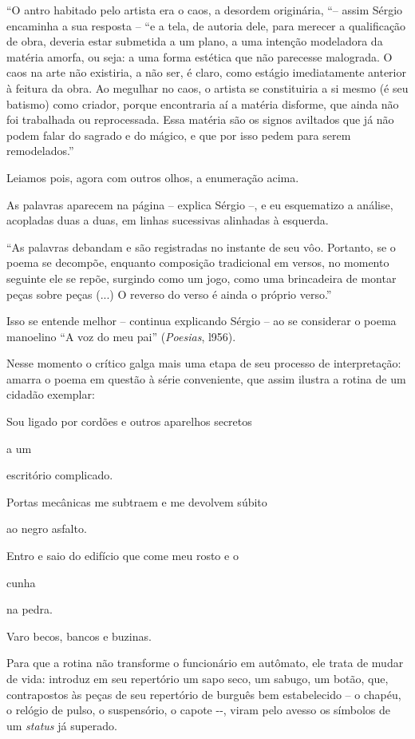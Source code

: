 ``O antro habitado pelo artista era o caos, a desordem originária, ``--
assim Sérgio encaminha a sua resposta -- ``e a tela, de autoria dele,
para merecer a qualificação de obra, deveria estar submetida a um plano,
a uma intenção modeladora da matéria amorfa, ou seja: a uma forma
estética que não parecesse malograda. O caos na arte não existiria, a
não ser, é claro, como estágio imediatamente anterior à feitura da obra.
Ao megulhar no caos, o artista se constituiria a si mesmo (é seu
batismo) como criador, porque encontraria aí a matéria disforme, que
ainda não foi trabalhada ou reprocessada. Essa matéria são os signos
aviltados que já não podem falar do sagrado e do mágico, e que por isso
pedem para serem remodelados.''

Leiamos pois, agora com outros olhos, a enumeração acima.

As palavras aparecem na página -- explica Sérgio --, e eu esquematizo a
análise, acopladas duas a duas, em linhas sucessivas alinhadas à
esquerda.

``As palavras debandam e são registradas no instante de seu vôo.
Portanto, se o poema se decompõe, enquanto composição tradicional em
versos, no momento seguinte ele se repõe, surgindo como um jogo, como
uma brincadeira de montar peças sobre peças (...) O reverso do verso é
ainda o próprio verso.''

Isso se entende melhor -- continua explicando Sérgio -- ao se considerar
o poema manoelino ``A voz do meu pai'' (\emph{Poesias}, l956).

Nesse momento o crítico galga mais uma etapa de seu processo de
interpretação: amarra o poema em questão à série conveniente, que assim
ilustra a rotina de um cidadão exemplar:

Sou ligado por cordões e outros aparelhos secretos

a um

escritório complicado.

Portas mecânicas me subtraem e me devolvem súbito

ao negro asfalto.

Entro e saio do edifício que come meu rosto e o

cunha

na pedra.

Varo becos, bancos e buzinas.

Para que a rotina não transforme o funcionário em autômato, ele trata de
mudar de vida: introduz em seu repertório um sapo seco, um sabugo, um
botão, que, contrapostos às peças de seu repertório de burguês bem
estabelecido -- o chapéu, o relógio de pulso, o suspensório, o capote
-\/-, viram pelo avesso os símbolos de um \emph{status} já superado.

